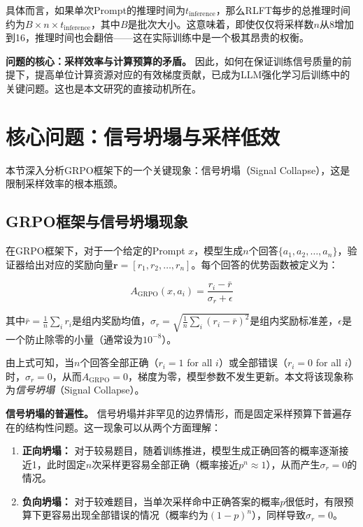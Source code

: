 具体而言，如果单次Prompt的推理时间为$t_\text{inference}$，那么RLFT每步的总推理时间约为$B \times n \times t_\text{inference}$，其中$B$是批次大小。这意味着，即使仅仅将采样数$n$从8增加到16，推理时间也会翻倍——这在实际训练中是一个极其昂贵的权衡。

\textbf{问题的核心：采样效率与计算预算的矛盾。} 因此，如何在保证训练信号质量的前提下，提高单位计算资源对应的有效梯度贡献，已成为LLM强化学习后训练中的关键问题。这也是本文研究的直接动机所在。

\section{核心问题：信号坍塌与采样低效}
\label{sec:signal_collapse}

本节深入分析GRPO框架下的一个关键现象：信号坍塌（Signal Collapse），这是限制采样效率的根本瓶颈。

\subsection{GRPO框架与信号坍塌现象}
\label{subsec:grpo_signal_collapse}

在GRPO框架下，对于一个给定的Prompt $x$，模型生成$n$个回答$\{a_1, a_2, \ldots, a_n\}$，验证器给出对应的奖励向量$\mathbf{r} = [r_1, r_2, \ldots, r_n]$。每个回答的优势函数被定义为：

\begin{equation}
A_\text{GRPO}(x, a_i) = \frac{r_i - \bar{r}}{\sigma_r + \epsilon}
\label{eq:grpo_advantage}
\end{equation}

其中$\bar{r} = \frac{1}{n}\sum_i r_i$是组内奖励均值，$\sigma_r = \sqrt{\frac{1}{n}\sum_i(r_i - \bar{r})^2}$是组内奖励标准差，$\epsilon$是一个防止除零的小量（通常设为$10^{-8}$）。

由上式可知，当$n$个回答全部正确（$r_i = 1$ for all $i$）或全部错误（$r_i = 0$ for all $i$）时，$\sigma_r = 0$，从而$A_\text{GRPO} = 0$，梯度为零，模型参数不发生更新。本文将该现象称为\textit{信号坍塌}（Signal Collapse）。

\textbf{信号坍塌的普遍性。} 信号坍塌并非罕见的边界情形，而是固定采样预算下普遍存在的结构性问题。这一现象可以从两个方面理解：

\begin{enumerate}
    \item \textbf{正向坍塌：} 对于较易题目，随着训练推进，模型生成正确回答的概率逐渐接近1，此时固定$n$次采样更容易全部正确（概率接近$p^n \approx 1$），从而产生$\sigma_r = 0$的情况。
    \item \textbf{负向坍塌：} 对于较难题目，当单次采样命中正确答案的概率$p$很低时，有限预算下更容易出现全部错误的情况（概率约为$(1-p)^n$），同样导致$\sigma_r = 0$。
\end{enumerate}


